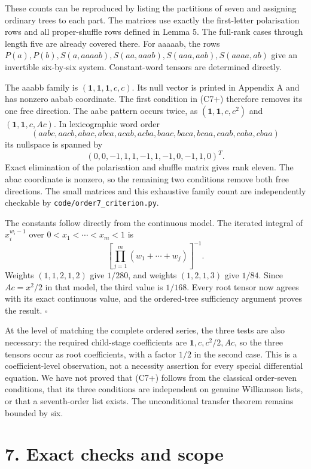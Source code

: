 \documentclass[
  11pt,
  a4paper,
]{scrartcl}
\begin{document}
These counts can be reproduced by listing the partitions of seven and
assigning ordinary trees to each part. The matrices use exactly the
first-letter polarisation rows and all proper-shuffle rows defined in
Lemma 5. The full-rank cases through length five are already covered
there. For aaaaab, the rows
\(P(a),P(b),S(a,aaaab),S(aa,aaab),S(aaa,aab),S(aaaa,ab)\) give an
invertible six-by-six system. Constant-word tensors are determined
directly.

The aaabb family is \((\mathbf1,\mathbf1,\mathbf1,c,c)\). Its null
vector is printed in Appendix A and has nonzero aabab coordinate. The
first condition in (C7+) therefore removes its one free direction. The
aabc pattern occurs twice, as \((\mathbf1,\mathbf1,c,c^2)\) and
\((\mathbf1,\mathbf1,c,Ac)\). In lexicographic word order \[
(aabc,aacb,abac,abca,acab,acba,baac,baca,bcaa,caab,caba,cbaa)
\] its nullspace is spanned by \[
(0,0,-1,1,1,-1,1,-1,0,-1,1,0)^T.
\] Exact elimination of the polarisation and shuffle matrix gives rank
eleven. The abac coordinate is nonzero, so the remaining two conditions
remove both free directions. The small matrices and this exhaustive
family count are independently checkable by
\texttt{code/order7\_criterion.py}.

The constants follow directly from the continuous model. The iterated
integral of \(x_i^{w_i-1}\) over \(0<x_1<\cdots<x_m<1\) is \[
\left[\prod_{j=1}^m(w_1+\cdots+w_j)\right]^{-1}.
\] Weights \((1,1,2,1,2)\) give \(1/280\), and weights \((1,2,1,3)\)
give \(1/84\). Since \(Ac=x^2/2\) in that model, the third value is
\(1/168\). Every root tensor now agrees with its exact continuous value,
and the ordered-tree sufficiency argument proves the result. \(\square\)

At the level of matching the complete ordered series, the three tests
are also necessary: the required child-stage coefficients are
\(\mathbf1,c,c^2/2,Ac\), so the three tensors occur as root
coefficients, with a factor \(1/2\) in the second case. This is a
coefficient-level observation, not a necessity assertion for every
special differential equation. We have not proved that (C7+) follows
from the classical order-seven conditions, that its three conditions are
independent on genuine Williamson lists, or that a seventh-order list
exists. The unconditional transfer theorem remains bounded by six.

\section{7. Exact checks and scope}\label{exact-checks-and-scope}
\end{document}
